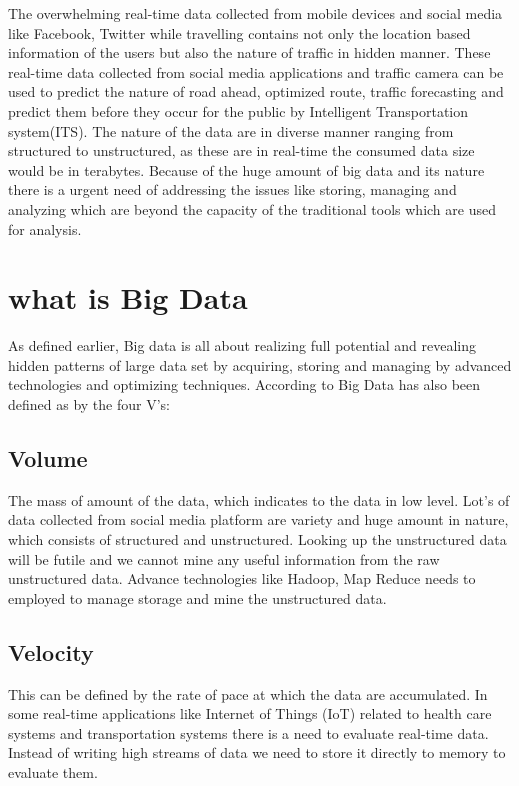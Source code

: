 \documentclass[sigconf]{acmart}
\begin{document}
The overwhelming real-time data collected from mobile devices and social media like Facebook, Twitter while travelling contains not only the location based information of the users but also the nature of traffic in hidden manner. These real-time data collected from social media applications and traffic camera can be used to predict the nature of road ahead, optimized route, traffic forecasting and predict them before they occur for the public by Intelligent Transportation system(ITS)\cite{its}. The nature of the data are in diverse manner ranging from structured to unstructured, as these are in real-time the consumed data size would be in terabytes. Because of the huge amount of big data and its nature there is a urgent need of addressing the issues like storing, managing and analyzing which are beyond the capacity of the traditional tools which are used for analysis.


\section{what is Big Data}

As defined earlier, Big data is all about realizing full potential and revealing hidden patterns of large data set by acquiring, storing and managing by advanced technologies and optimizing techniques. According to\cite{bigdata} Big Data has also been defined as by the four V's:

\subsection{Volume}

The mass of amount of the data, which indicates to the data in low level. Lot's of data collected from social media platform are variety and huge amount in nature, which consists of structured and unstructured. Looking up the unstructured data will be futile and we cannot mine any useful information from the raw unstructured data. Advance technologies like Hadoop, Map Reduce\cite{mapreduce,hadoop} needs to employed to manage storage and mine the unstructured data.

\subsection{Velocity}

This can be defined by the rate of pace at which the data are accumulated. In some real-time applications like Internet of Things (IoT) related to health care systems and transportation systems there is a need to evaluate real-time data. Instead of writing high streams of data we need to store it directly to memory to evaluate them. 
\end{document}
